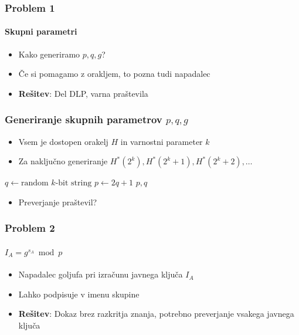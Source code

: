 \documentclass{beamer}    %
\begin{document}
\begin{frame}
    \frametitle{Problem 1}
    \framesubtitle{Skupni parametri}
    \begin{itemize}
        \item Kako generiramo $p, q, g$?
        \item Če si pomagamo z orakljem, to pozna tudi napadalec
        \vspace{1cm}
        \item \textbf{Rešitev}: Del DLP, varna praštevila
    \end{itemize}
\end{frame}

\begin{frame}
    \frametitle{Generiranje skupnih parametrov $p, q, g$}
    \begin{itemize}
        \item Vsem je dostopen orakelj $H$ in varnostni parameter $k$
        \item Za naključno generiranje $H^*(2^k), H^*(2^k + 1), H^*(2^k + 2), \dots$
    \end{itemize}
    \vspace{0.5cm}
    \begin{algorithmic}
        \State $q \gets \text{random $k$-bit string}$
        \State $p \gets 2q + 1$
            \Return $p, q$
        \EndIf
    \EndWhile
    \end{algorithmic}
    \vspace{0.5cm}
    \begin{itemize}
        \item Preverjanje praštevil?
    \end{itemize}
\end{frame}

\begin{frame}
    \frametitle{Problem 2}
    \framesubtitle{$I_A = g^{s_A} \bmod p$}
    \begin{itemize}
        \item Napadalec goljufa pri izračunu javnega ključa $I_A$
        \item Lahko podpisuje v imenu skupine
        \vspace{1cm}
        \item \textbf{Rešitev}: Dokaz brez razkritja znanja, potrebno preverjanje 
                vsakega javnega ključa
    \end{itemize}
\end{frame}
\end{document}
